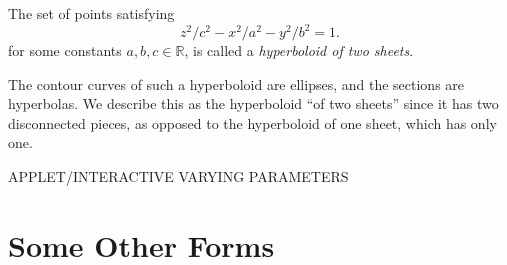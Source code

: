 \documentclass{ximera}
\begin{document}
\begin{example}
The set of points satisfying
\[
z^2/c^2 -x^2/a^2 - y^2/b^2 =1.
\]
for some constants $a,b,c\in\mathbb{R}$, is called a \emph{hyperboloid of two sheets}.

\begin{image}
\end{image}

The contour curves of such a hyperboloid are ellipses, and the sections are hyperbolas. We describe this as the hyperboloid ``of two sheets'' since it has two disconnected pieces, as opposed to the hyperboloid of one sheet, which has only one.
\end{example}

APPLET/INTERACTIVE VARYING PARAMETERS

\section*{Some Other Forms}
\end{document}
